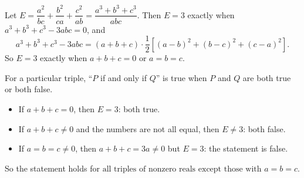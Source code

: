 Let $E=\dfrac{a^2}{bc}+\dfrac{b^2}{ca}+\dfrac{c^2}{ab}=\dfrac{a^3+b^3+c^3}{abc}$. Then $E=3$ exactly when $a^3+b^3+c^3-3abc=0$, and
\[
a^3+b^3+c^3-3abc=(a+b+c)\cdot\dfrac{1}{2}\left[(a-b)^2+(b-c)^2+(c-a)^2\right].
\]
So $E=3$ exactly when $a+b+c=0$ or $a=b=c$.

For a particular triple, ``$P$ if and only if $Q$'' is true when $P$ and $Q$ are both true or both false.
\begin{itemize}
\item If $a+b+c=0$, then $E=3$: both true.
\item If $a+b+c\ne0$ and the numbers are not all equal, then $E\ne3$: both false.
\item If $a=b=c\ne0$, then $a+b+c=3a\ne0$ but $E=3$: the statement is false.
\end{itemize}
So the statement holds for $\boxed{\text{all triples of nonzero reals except those with }a=b=c}$.
